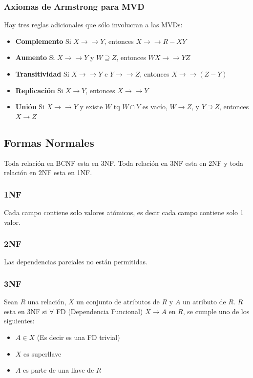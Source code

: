 \documentclass[11pt,letterpaper]{article}
\begin{document}
\subsubsection{Axiomas de Armstrong para MVD}
Hay tres reglas adicionales que sólo involucran a las MVDs:
\begin{itemize}
	\item \textbf{Complemento} Si $X \rightarrow\rightarrow Y$, entonces $X\rightarrow\rightarrow R-XY$
	\item \textbf{Aumento} Si $X \rightarrow\rightarrow Y$ y $W\supseteq Z$, entonces $WX\rightarrow\rightarrow YZ$
	\item \textbf{Transitividad} Si $X \rightarrow\rightarrow Y$ e $Y \rightarrow\rightarrow Z$, entonces $X \rightarrow\rightarrow (Z-Y)$
	\item \textbf{Replicación} Si $X \rightarrow Y$, entonces $X \rightarrow\rightarrow Y$
	\item \textbf{Unión} Si $X \rightarrow\rightarrow Y$ y existe $W$ tq $W\cap Y$ es vacío, $W\rightarrow Z$, y $Y\supseteq Z$, entonces $X\rightarrow Z$
\end{itemize}

\subsection{Formas Normales}
Toda relación en BCNF esta en 3NF. Toda relación en 3NF esta en 2NF y toda relación en 2NF esta en 1NF.

\subsubsection{1NF}
Cada campo contiene solo valores atómicos, es decir cada campo contiene solo 1 valor.

\subsubsection{2NF}
Las dependencias parciales no están permitidas.

\subsubsection{3NF} 
Sean $R$ una relación, $X$ un conjunto de atributos de $R$ y $A$ un atributo de $R$.
$R$ esta en 3NF si $\forall$ FD (Dependencia Funcional) $X \rightarrow A$ en $R$, se cumple uno de los siguientes:
\begin{itemize}
	\item $A \in X$ (Es decir es una FD trivial)
	\item $X$ es superllave
	\item $A$ es parte de una llave de $R$
\end{itemize}
\end{document}

